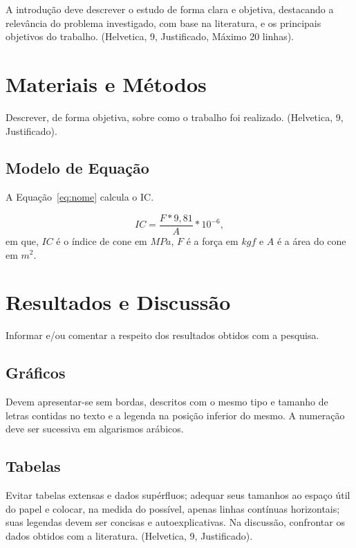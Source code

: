 \documentclass[a4paper,10pt]{article} %
\begin{document}
A introdução deve descrever o estudo de forma clara e objetiva, destacando a relevância do problema investigado, com base na literatura, e os principais objetivos do trabalho. (Helvetica, 9, Justificado, Máximo 20 linhas).

\section{Materiais e Métodos}

Descrever, de forma objetiva, sobre como o trabalho foi realizado. (Helvetica, 9, Justificado).

\subsection{Modelo de Equação}

A Equação~\ref{eq:nome} calcula o IC.

\begin{equation} \label{eq:nome}
IC=\frac{F*9,81}{A}*10^{-6},
\end{equation}
em que, $IC$ é o índice de cone em $MPa$, $F$ é a força em $kgf$ e $A$ é a área do cone em $m^{2}$.

\section{Resultados e Discussão}

Informar e/ou comentar a respeito dos resultados obtidos com a pesquisa.

\subsection{Gráficos}

Devem apresentar-se sem bordas, descritos com o mesmo tipo e tamanho de letras contidas no texto e a legenda na posição inferior do mesmo. A numeração deve ser sucessiva em algarismos arábicos.

\subsection{Tabelas} 

Evitar tabelas extensas e dados supérfluos; adequar seus tamanhos ao espaço útil do papel e colocar, na medida do possível, apenas linhas contínuas horizontais; suas legendas devem ser concisas e autoexplicativas. Na discussão, confrontar os dados obtidos com a literatura. (Helvetica, 9, Justificado).
\end{document}
